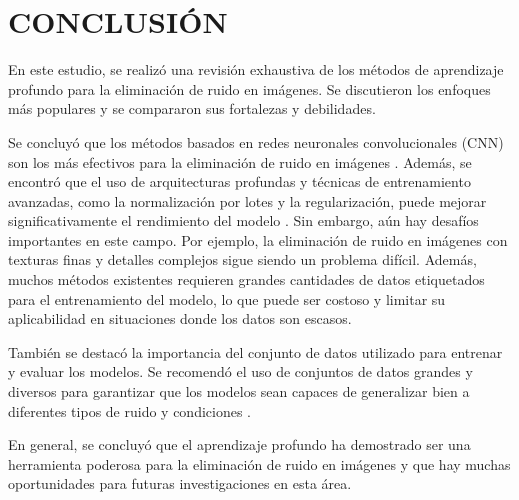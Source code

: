 \documentclass[a4paper,
               ]{jacow}
\begin{document}
\section{CONCLUSIÓN}

En este estudio, se realizó una revisión exhaustiva de los métodos de aprendizaje profundo para la eliminación de ruido en imágenes. Se discutieron los enfoques más populares y se compararon sus fortalezas y debilidades.

Se concluyó que los métodos basados en redes neuronales convolucionales (CNN) son los más efectivos para la eliminación de ruido en imágenes \cite{zhang2017beyond, lehtinen2018noise2noise, tai2017image}. Además, se encontró que el uso de arquitecturas profundas y técnicas de entrenamiento avanzadas, como la normalización por lotes y la regularización, puede mejorar significativamente el rendimiento del modelo \cite{lefkimmiatis2018universal}. Sin embargo, aún hay desafíos importantes en este campo. Por ejemplo, la eliminación de ruido en imágenes con texturas finas y detalles complejos sigue siendo un problema difícil. Además, muchos métodos existentes requieren grandes cantidades de datos etiquetados para el entrenamiento del modelo, lo que puede ser costoso y limitar su aplicabilidad en situaciones donde los datos son escasos.

También se destacó la importancia del conjunto de datos utilizado para entrenar y evaluar los modelos. Se recomendó el uso de conjuntos de datos grandes y diversos para garantizar que los modelos sean capaces de generalizar bien a diferentes tipos de ruido y condiciones \cite{zhang2018learning}.

En general, se concluyó que el aprendizaje profundo ha demostrado ser una herramienta poderosa para la eliminación de ruido en imágenes y que hay muchas oportunidades para futuras investigaciones en esta área.
\end{document}
